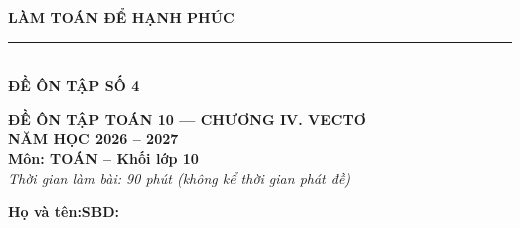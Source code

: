 \documentclass[10pt,a4paper]{article}
\begin{document}
\noindent
\begin{minipage}[c]{0.38\textwidth}
    \centering
    \textbf{LÀM TOÁN ĐỂ HẠNH PHÚC}\\[-2pt]
    \rule{3.2cm}{0.6pt}\\[2pt]
    \textbf{ĐỀ ÔN TẬP SỐ 4}
\end{minipage}\hfill
\begin{minipage}[c]{0.52\textwidth}
    \centering
    \textbf{ĐỀ ÔN TẬP TOÁN 10 — CHƯƠNG IV. VECTƠ}\\[1pt]
    \textbf{NĂM HỌC 2026 -- 2027}\\[1pt]
    \textbf{Môn: TOÁN -- Khối lớp 10}\\
    \textit{\small Thời gian làm bài: 90 phút (không kể thời gian phát đề)}
\end{minipage}

\vspace{0.05cm}
\noindent
\begin{minipage}[b]{0.78\textwidth}
    \textbf{Họ và tên:}\dotfill\textbf{SBD:}\makebox[3.5cm]{\dotfill}
\end{minipage}\hfill
\begin{minipage}[b]{0.20\textwidth}
    \hfill
    \setlength{\fboxrule}{0.8pt}%
\end{minipage}
\vspace{0.05cm}
\end{document}
